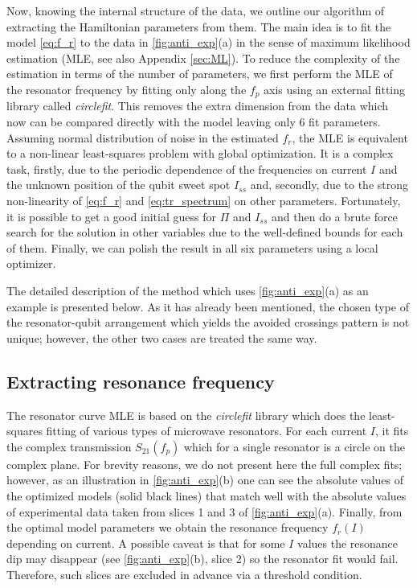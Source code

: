 \documentclass[%
 aip,
 draft,
 amsmath,amssymb,
 reprint,%
]{revtex4-1}
\begin{document}
Now, knowing the internal structure of the data, we outline our algorithm of extracting the Hamiltonian parameters from them. The main idea is to fit the model \eqref{eq:f_r} to the data in \autoref{fig:anti_exp}(a) in the sense of maximum likelihood estimation\cite{bishop2006} (MLE, see also Appendix \ref{sec:ML}). To reduce the complexity of the estimation in terms of the number of parameters, we first perform the MLE of the resonator frequency by fitting only along the $f_p$ axis using an external fitting library called \textit{circlefit}\cite{probst2015}. This removes the extra dimension from the data which now can be compared directly with the model leaving only 6 fit parameters. Assuming normal distribution of noise in the estimated $f_r$, the MLE is equivalent to a non-linear least-squares problem with global optimization. It is a complex task, firstly, due to the periodic dependence of the frequencies on current $I$ and the unknown position of the qubit sweet spot $I_{ss}$ and, secondly, due to the strong non-linearity of \eqref{eq:f_r} and \eqref{eq:tr_spectrum} on other parameters. Fortunately, it is possible to get a good initial guess for $\Pi$ and $I_{ss}$ and then do a brute force search for the solution in other variables due to the well-defined bounds for each of them. Finally, we can polish the result in all six parameters using a local optimizer.

The detailed description of the method which uses \autoref{fig:anti_exp}(a) as an example is presented below. As it has already been mentioned, the chosen type of the resonator-qubit arrangement which yields the avoided crossings pattern is not unique; however, the other two cases are treated the same way.

\subsection{Extracting resonance frequency}\label{sec:extract_fr}

The resonator curve MLE is based on the \textit{circlefit} library which does the least-squares fitting of various types of microwave resonators. For each current $I$, it fits the complex transmission $S_{21}(f_p)$ which for a single resonator is a circle on the complex plane\cite{probst2015}. For brevity reasons, we do not present here the full complex fits; however, as an illustration in \autoref{fig:anti_exp}(b) one can see the absolute values of the optimized models (solid black lines) that match well with the absolute values of experimental data taken from slices 1 and 3 of \autoref{fig:anti_exp}(a). Finally, from the optimal model parameters we obtain the resonance frequency $f_r(I)$ depending on current. A possible caveat is that for some $I$ values the resonance dip may disappear (see \autoref{fig:anti_exp}(b), slice 2) so the resonator fit would fail. Therefore, such slices are excluded in advance via a threshold condition.
\end{document}
